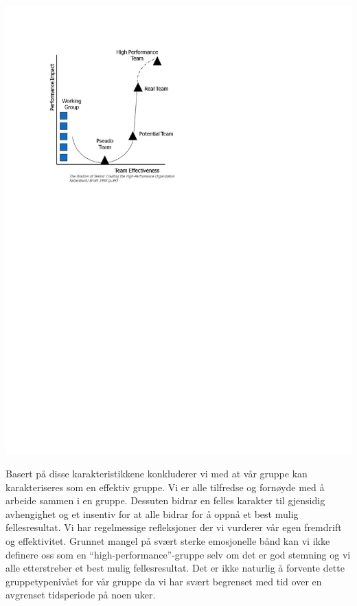 \begin{enumerate}
\begin{center}
\includegraphics[clip=true, width=1 \textwidth,
trim=0cm 16cm 4cm 2cm]{Gruppetypene.pdf}
\label{fig:gruppetype}
\end{center}

\end{enumerate}

Basert på disse karakteristikkene konkluderer vi med at vår gruppe kan karakteriseres som en effektiv gruppe. Vi er alle tilfredse og fornøyde med å arbeide sammen i en gruppe. Dessuten bidrar en felles karakter til gjensidig avhengighet og et insentiv for at alle bidrar for å oppnå et best mulig fellesresultat. Vi har regelmessige refleksjoner der vi vurderer vår egen fremdrift og effektivitet. Grunnet mangel på svært sterke emosjonelle bånd kan vi ikke definere oss som en ``high-performance''-gruppe selv om det er god stemning og vi alle etterstreber et best mulig fellesresultat. Det er ikke naturlig å forvente dette gruppetypenivået for vår gruppe da vi har svært begrenset med tid over en avgrenset tidsperiode på noen uker.\\

